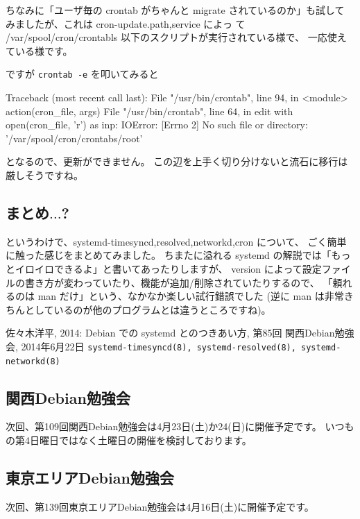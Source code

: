 \documentclass[mingoth,a4paper]{jsarticle}
\begin{document}
ちなみに「ユーザ毎の crontab がちゃんと migrate されているのか」も試して
みましたが、これは cron-update.{path,service} によっ
て /var/spool/cron/crontabls 以下のスクリプトが実行されている様で、
一応使えている様です。

ですが \verb|crontab -e| を叩いてみると
\begin{commandline}
  Traceback (most recent call last):
  File "/usr/bin/crontab", line 94, in <module>
    action(cron_file, args)
  File "/usr/bin/crontab", line 64, in edit
    with open(cron_file, 'r') as inp:
IOError: [Errno 2] No such file or directory: '/var/spool/cron/crontabs/root'
\end{commandline}
となるので、更新ができません。
この辺を上手く切り分けないと流石に移行は厳しそうですね。

\subsection{まとめ$\dots$?}

というわけで、systemd-{timesyncd,resolved,networkd,cron} について、
ごく簡単に触った感じをまとめてみました。
%
ちまたに溢れる systemd の解説では「もっとイロイロできるよ」と書いてあったりしますが、
version によって設定ファイルの書き方が変わっていたり、機能が追加/削除されていたりするので、
「頼れるのは man だけ」という、なかなか楽しい試行錯誤でした%
(逆に man は非常きちんとしているのが他のプログラムとは違うところですね)。

\renewcommand{\refname}{\normalsize{\textbf{参考文献}}}
\begin{thebibliography}{99}
%
  佐々木洋平, 2014: Debian での systemd とのつきあい方,
  第85回 関西Debian勉強会, 2014年6月22日
  \texttt{systemd-timesyncd(8), systemd-resolved(8), systemd-networkd(8)}
\end{thebibliography}



\subsection{関西Debian勉強会}
次回、第109回関西Debian勉強会は4月23日(土)か24(日)に開催予定です。
いつもの第4日曜日ではなく土曜日の開催を検討しております。

\subsection{東京エリアDebian勉強会}
次回、第139回東京エリアDebian勉強会は4月16日(土)に開催予定です。
\end{document}

